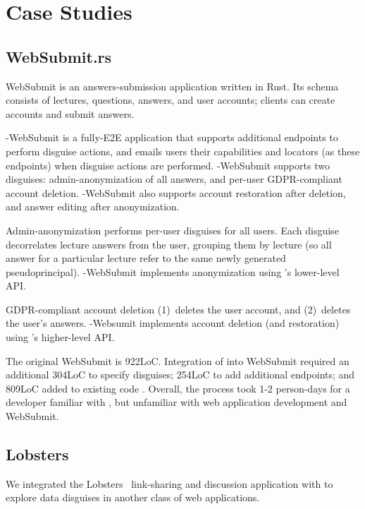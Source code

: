 \section{Case Studies}

\subsection{WebSubmit.rs}
WebSubmit is an answers-submission application written in Rust. 
Its schema consists of lectures, questions, answers, and user accounts; 
clients can create accounts and submit answers. 

\sys-WebSubmit is a fully-E2E application that supports additional endpoints to perform disguise
actions, and emails users their capabilities and locators (as these endpoints) when disguise actions
are performed. \sys-WebSubmit supports two disguises: admin-anonymization of all answers, and
per-user GDPR-compliant account deletion. \sys-WebSubmit also supports account restoration after
deletion, and answer editing after anonymization.  

Admin-anonymization performs per-user disguises for all users.
Each disguise decorrelates lecture answers from the user, grouping them by lecture (so all answer
for a particular lecture refer to the same newly generated pseudoprincipal).
\sys-WebSubmit implements anonymization using \sys's lower-level API.

GDPR-compliant account deletion 
%
(1)~deletes the user account, and 
%
(2)~deletes the user's answers. 
\sys-Websumit implements account deletion (and restoration) using \sys's higher-level API.

The original WebSubmit is 922LoC. Integration of \sys into WebSubmit required an additional 304LoC
to specify disguises; 254LoC to add additional endpoints; and 809LoC added to existing code . Overall, the process took 1-2 person-days for
a developer familiar with \sys, but unfamiliar with web application development and
WebSubmit.

\subsection{Lobsters} 
We integrated the Lobsters~\cite{lobsters} link-sharing and discussion application with \sys to
explore data disguises in another class of web applications.

